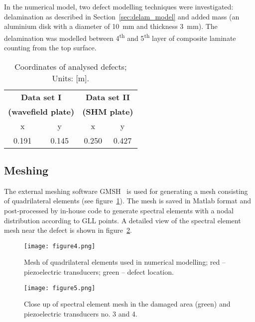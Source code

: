 \documentclass[12pt]{iopart}
\begin{document}
In the numerical model, two defect modelling techniques were investigated: delamination as described in Section~\ref{sec:delam_model} and added mass (an aluminium disk with a diameter of 10~mm and thickness 3~mm). The delamination was modelled between 4\textsuperscript{th} and 5\textsuperscript{th} layer of composite laminate counting from the top surface.
\begin{table}
	\caption{Coordinates of analysed defects; Units: [m].}
	\begin{indented}
	\item[]\begin{tabular}{cccc} 
		\toprule
		\multicolumn{2}{c}{\textbf{Data set I} }	& \multicolumn{2}{c}{\textbf{Data set II} } \\
		\multicolumn{2}{c}{\textbf{(wavefield plate)} }	& \multicolumn{2}{c}{\textbf{(SHM plate)} } \\
		\cmidrule(lr){1-2} \cmidrule(lr){3-4}
		x & y &  x &  y  \\
		0.191 & 0.145 & 0.250  & 0.427 \\ 
		\bottomrule 
	\end{tabular} 
	\end{indented}
	\label{tab:defect_coordinates}
\end{table}	
	
\subsection{Meshing}
The external meshing software GMSH~\cite{Geuzaine2009} is used for generating a mesh consisting of quadrilateral elements (see figure~\ref{fig:quad_mesh}). The mesh is saved in Matlab format and post-processed by in-house code to generate spectral elements with a nodal distribution according to GLL points. A detailed view of the spectral element mesh near the defect is shown in figure~\ref{fig:spec_mesh_zoom}. 
\begin{figure} [h!]
	\centering
	\texttt{[image: figure4.png]}	
	\caption{Mesh of quadrilateral elements used in numerical modelling; red -- piezoelectric transducers; green -- defect location.}
	\label{fig:quad_mesh}
\end{figure}
\begin{figure} [h!]
	\centering
	\texttt{[image: figure5.png]}	
	\caption{Close up of spectral element mesh in the damaged area (green) and piezoelectric transducers no. 3 and 4.}
	\label{fig:spec_mesh_zoom}
\end{figure}
\clearpage
\end{document}
